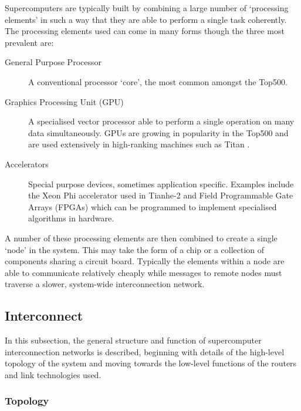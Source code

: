 			Supercomputers are typically built by combining a large number of
			`processing elements' in such a way that they are able to perform a single
			task coherently. The processing elements used can come in many forms
			though the three most prevalent are:
			
			\begin{description}
				
				\item[General Purpose Processor] A conventional processor `core', the
				most common amongst the Top500.
				
				\item[Graphics Processing Unit (GPU)] A specialised vector processor
				able to perform a single operation on many data simultaneously. GPUs are
				growing in popularity in the Top500 and are used extensively in
				high-ranking machines such as Titan \cite{bland12}.
				
				\item[Accelerators] Special purpose devices, sometimes application
				specific. Examples include the Xeon Phi accelerator used in Tianhe-2
				\cite{dongarra13} and Field Programmable Gate Arrays (FPGAs) which can
				be programmed to implement specialised algorithms in hardware.
				
			\end{description}
			
			A number of these processing elements are then combined to create a single
			`node' in the system. This may take the form of a chip or a collection of
			components sharing a circuit board. Typically the elements within a node
			are able to communicate relatively cheaply while messages to remote nodes
			must traverse a slower, system-wide interconnection network.
		
		\subsection{Interconnect}
			
			In this subsection, the general structure and function of supercomputer
			interconnection networks is described, beginning with details of the
			high-level topology of the system and moving towards the low-level
			functions of the routers and link technologies used.
			
			\subsubsection{Topology}
				
